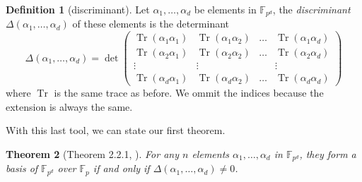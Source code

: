 \documentclass[a4paper,11pt]{article}
\theoremstyle{break}
\newtheorem{thm}{Theorem}[section]
\theoremstyle{sc}
\theoremstyle{definition}
\newtheorem{defi}[thm]{Definition}
\theoremstyle{remark}
\DeclareMathOperator{\Tr}{Tr}
\begin{document}
\begin{defi}[discriminant]
  Let $\alpha_1, \dots, \alpha_d$ be elements in $\mathbb{F}_{p^d}$, the
  \emph{discriminant} $\Delta(\alpha_1, \dots, \alpha_d)$ of these elements
  is the determinant
  \[
    \Delta(\alpha_1, \dots, \alpha_d)=\det
    \begin{pmatrix}
      \Tr(\alpha_1\alpha_1) & \Tr(\alpha_1\alpha_2) & \dots &
      \Tr(\alpha_1\alpha_d) \\
      \Tr(\alpha_2\alpha_1) & \Tr(\alpha_2\alpha_2) & \dots &
      \Tr(\alpha_2\alpha_d) \\
      \vdots & \vdots & & \vdots \\
      \Tr(\alpha_d\alpha_1) & \Tr(\alpha_d\alpha_2) & \dots &
      \Tr(\alpha_d\alpha_d)
    \end{pmatrix}
  \]
  where $\Tr$ is the same trace as before. We ommit the indices because
  the extension is always the same.
\end{defi}

With this last tool, we can state our first theorem.

\begin{thm}[Theorem 2.2.1, \cite{Ga93}]
  For any $n$ elements $\alpha_1, \dots, \alpha_d$ in
  $\mathbb{F}_{p^d}$, they form a basis of $\mathbb{F}_{p^d}$ over
  $\mathbb{F}_p$ if and only if $\Delta(\alpha_1, \dots,
  \alpha_d)\neq0$.
\end{thm}
\end{document}
